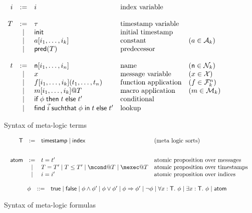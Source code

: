 \begin{figure}[t]
\[
  \begin{array}{rclll}
    i &:=& i & \text{index variable} & \\
    \\
    T &:=& \tau & \text{timestamp variable} & \\
      &\mid& \mathsf{init} & \text{initial timestamp} & \\
      &\mid& a[i_1,\ldots,i_k] & \text{constant} & (a\in\mathcal{A}_k) \\
      &\mid & \textsf{pred}(T) & \text{predecessor} & \\
    \\
    t & := & \mathsf{n}[i_1,\ldots,i_n] &\text{name} & (\mathsf{n}\in\mathcal{N}_k) \\
      & \mid & x  & \text{message variable} & (x\in\mathcal{X}) \\
      & \mid & f[i_1,\ldots,i_k](t_1,\dots,t_n) &\text{function application} &
      (f\in\mathcal{F}_k^n)\\
      & \mid & m[i_1,\ldots,i_k]@T &\text{macro application} & (m\in\mathcal{M}_k)\\
      & \mid & \textsf{if}\; \phi \;\textsf{then}\; t \;\textsf{else}\; t'
        &\text{conditional} \\
      & \mid & \textsf{find}\; \vec{i} \;\textsf{suchthat}\; \phi \;\textsf{in}\; t \;\textsf{else}\; t'
        &\text{lookup}
  \end{array}
\]
\caption{Syntax of meta-logic terms}\label{fig:terms}
\end{figure}

\begin{figure}[t]
  \[
  \begin{array}{c}
   \begin{array}{rcll}
    \T &  := & \timestamp \mid \idx & \text{(meta logic sorts)} \\
    \\[2ex]
   \atom & := & t=t'
 & \text{atomic proposition over messages } \\
  &\mid & T=T' \mid T \leq T' \mid \mcond@T \mid \mexec@T &  \text{atomic proposition
  over timestamps } \\
  &\mid & i=i'  &  \text{atomic proposition
    over indices } \\
    \end{array}
\\
\\
     \begin{array}{rcll}
    \phi & ::= &  \true \mid \false \mid \phi \wedge \phi' \mid  \phi
    \vee \phi' \mid   \phi \Rightarrow \phi'\mid \neg \phi \mid
    \forall x : \T.\ \phi \mid \exists x:\T.\ \phi \mid \atom &
    \end{array}

\end{array}
    \]
    \caption{Syntax of meta-logic formulas}\label{fig:formulas}
\end{figure}

